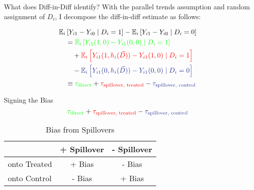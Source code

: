 \documentclass[aspectratio=43]{beamer}
\begin{document}
\begin{frame}{What does Diff-in-Diff identify?}
    With the parallel trends assumption and random assignment of $D_i$, I decompose the diff-in-diff estimate as follows: 
        
    \begin{align*}
        &\mathbb{E}_i \left[ Y_{i1} - Y_{i0} \mid D_i = 1 \right] - \mathbb{E}_i \left[ Y_{i1} - Y_{i0} \mid D_i = 0 \right] \\
        &\quad = 
        \textcolor{green}{\mathbb{E}_i \left[ Y_{i1}(1, 0) - Y_{i1}(0, 0) \mid D_i = 1 \right]} \\
        &\quad\quad + 
        \textcolor{red}{\mathbb{E}_i \left[ Y_{i1}(1, h_i(\vec{D})) - Y_{i1}(1, 0) \mid D_i = 1 \right]} \\ 
        &\quad\quad - 
        \textcolor{purple}{\mathbb{E}_i \left[ Y_{i1}(0, h_i(\vec{D})) - Y_{i1}(0, 0) \mid D_i = 0 \right]} \\
        &\quad \equiv \textcolor{green}{\tau_{\text{direct}}} + \textcolor{red}{\tau_{\text{spillover, treated}}} - \textcolor{purple}{\tau_{\text{spillover, control}}}
    \end{align*}

\end{frame}

\begin{frame}{Signing the Bias}
    \[ 
        \textcolor{green}{\tau_{\text{direct}}} + \textcolor{red}{\tau_{\text{spillover, treated}}} - \textcolor{purple}{\tau_{\text{spillover, control}}}    
    \]

    \begin{table}
        \caption{Bias from Spillovers}
        \begin{tabular}{|l|cc|}
            \hline
            & + Spillover & - Spillover \\ \hline
            onto Treated & + Bias & - Bias \\
            onto Control & - Bias & + Bias \\
            \hline
        \end{tabular}
    \end{table}
\end{frame}
\end{document}
